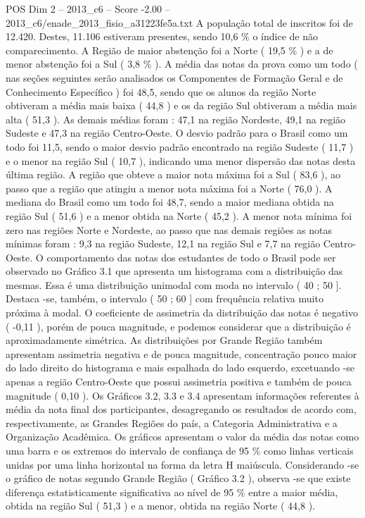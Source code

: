 \begin{textsample}{POS Dim 2 – 2013\_c6 – Score -2.00 – 2013\_c6/enade\_2013\_fisio\_a31223fe5a.txt}
A população total de inscritos foi de 12.420.
Destes, 11.106 estiveram presentes, sendo 10,6 \% o índice de não comparecimento.
A Região de maior abstenção foi a Norte ( 19,5 \% ) e a de menor abstenção foi a Sul ( 3,8 \% ).
A média das notas da prova como um todo ( nas seções seguintes serão analisados os Componentes de Formação Geral e de Conhecimento Específico ) foi 48,5, sendo que os alunos da região Norte obtiveram a média mais baixa ( 44,8 ) e os da região Sul obtiveram a média mais alta ( 51,3 ).
As demais médias foram : 47,1 na região Nordeste, 49,1 na região Sudeste e 47,3 na região Centro-Oeste.
O desvio padrão para o Brasil como um todo foi 11,5, sendo o maior desvio padrão encontrado na região Sudeste ( 11,7 ) e o menor na região Sul ( 10,7 ), indicando uma menor dispersão das notas desta última região.
A região que obteve a maior nota máxima foi a Sul ( 83,6 ), ao passo que a região que atingiu a menor nota máxima foi a Norte ( 76,0 ).
A mediana do Brasil como um todo foi 48,7, sendo a maior mediana obtida na região Sul ( 51,6 ) e a menor obtida na Norte ( 45,2 ).
A menor nota mínima foi zero nas regiões Norte e Nordeste, ao passo que nas demais regiões as notas mínimas foram : 9,3 na região Sudeste, 12,1 na região Sul e 7,7 na região Centro-Oeste.
O comportamento das notas dos estudantes de todo o Brasil pode ser observado no Gráfico 3.1 que apresenta um histograma com a distribuição das mesmas.
Essa é uma distribuição unimodal com moda no intervalo ( 40 ; 50 ].
Destaca -se, também, o intervalo ( 50 ; 60 ] com frequência relativa muito próxima à modal.
O coeficiente de assimetria da distribuição das notas é negativo ( -0,11 ), porém de pouca magnitude, e podemos considerar que a distribuição é aproximadamente simétrica.
As distribuições por Grande Região também apresentam assimetria negativa e de pouca magnitude, concentração pouco maior do lado direito do histograma e mais espalhada do lado esquerdo, excetuando -se apenas a região Centro-Oeste que possui assimetria positiva e também de pouca magnitude ( 0,10 ).
Os Gráficos 3.2, 3.3 e 3.4 apresentam informações referentes à média da nota final dos participantes, desagregando os resultados de acordo com, respectivamente, as Grandes Regiões do país, a Categoria Administrativa e a Organização Acadêmica.
Os gráficos apresentam o valor da média das notas como uma barra e os extremos do intervalo de confiança de 95 \% como linhas verticais unidas por uma linha horizontal na forma da letra H maiúscula.
Considerando -se o gráfico de notas segundo Grande Região ( Gráfico 3.2 ), observa -se que existe diferença estatisticamente significativa ao nível de 95 \% entre a maior média, obtida na região Sul ( 51,3 ) e a menor, obtida na região Norte ( 44,8 ).

\end{textsample}
